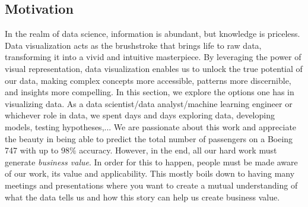 \documentclass[10pt]{extarticle}
\newcommand{\<}{\langle}
\renewcommand{\>}{\rangle}
\theoremstyle{mystyle}{\newtheorem*{remark}{Remark}}
\theoremstyle{mystyle}{\newtheorem*{remarks}{Remarks}}
\theoremstyle{mystyle}{\newtheorem*{example}{Example}}
\theoremstyle{mystyle}{\newtheorem*{examples}{Examples}}
\theoremstyle{definition}{\newtheorem*{exercise}{Exercise}}
\theoremstyle{warn}
\begin{document}
\subsection{Motivation}
In the realm of data science, information is abundant, but knowledge is priceless. Data visualization acts as the brushstroke that brings life to raw data, transforming it into a vivid and intuitive masterpiece. By leveraging the power of visual representation, data visualization enables us to unlock the true potential of our data, making complex concepts more accessible, patterns more discernible, and insights more compelling. In this section, we explore the options one has in visualizing data. As a data scientist/data analyst/machine learning engineer or whichever role in data, we spent days and days exploring data, developing models, testing hypotheses,... We are passionate about this work and appreciate the beauty in being able to predict the total number of passengers on a Boeing 747 with up to $98\%$ accuracy. However, in the end, all our hard work must generate \textit{business value}. In order for this to happen, people must be made aware of our work, its value and applicability. This mostly boils down to having many meetings and presentations where you want to create a mutual understanding of what the data tells us and how this story can help us create business value.
\end{document}

